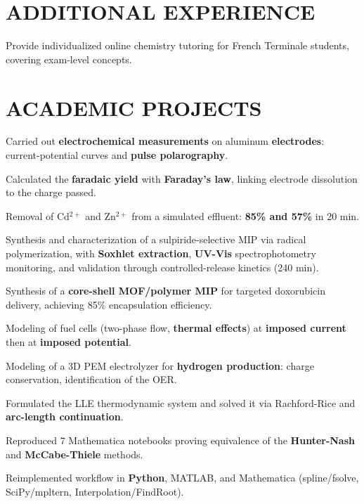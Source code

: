 \documentclass[10pt]{article}
\begin{document}
\section{ADDITIONAL EXPERIENCE}
\begin{bul}
\item Provide individualized online chemistry tutoring for French Terminale students, covering exam-level concepts.
\end{bul}

\section{ACADEMIC PROJECTS}
\begin{bul}
\item Carried out \textbf{electrochemical measurements} on aluminum \textbf{electrodes}: current-potential curves and \textbf{pulse polarography}.
\item Calculated the \textbf{faradaic yield} with \textbf{Faraday's law}, linking electrode dissolution to the charge passed.
\item Removal of Cd$^{2+}$ and Zn$^{2+}$ from a simulated effluent: \textbf{85\% and 57\%} in 20 min.
\end{bul}
\begin{bul}
\item Synthesis and characterization of a sulpiride-selective MIP via radical polymerization, with \textbf{Soxhlet extraction}, \textbf{UV-Vis} spectrophotometry monitoring, and validation through controlled-release kinetics (240 min).
\item Synthesis of a \textbf{core-shell MOF/polymer MIP} for targeted doxorubicin delivery, achieving 85\% encapsulation efficiency.
\end{bul}
\begin{bul}
\item Modeling of fuel cells (two-phase flow, \textbf{thermal effects}) at \textbf{imposed current} then at \textbf{imposed potential}.
\item Modeling of a 3D PEM electrolyzer for \textbf{hydrogen production}: charge conservation, identification of the OER.
\end{bul}
\begin{bul}
\item Formulated the LLE thermodynamic system and solved it via Rachford-Rice and \textbf{arc-length continuation}.
\item Reproduced 7 Mathematica notebooks proving equivalence of the \textbf{Hunter-Nash} and \textbf{McCabe-Thiele} methods.
\item Reimplemented workflow in \textbf{Python}, MATLAB, and Mathematica (spline/fsolve, SciPy/mpltern, Interpolation/FindRoot).
\end{bul}
\end{document}
